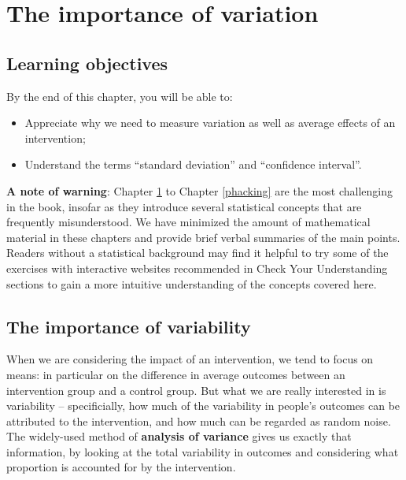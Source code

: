 \documentclass{krantz}
\providecommand{\tightlist}{%
\setlength{\itemsep}{0pt}\setlength{\parskip}{0pt}}
\begin{document}
\hypertarget{variation}{%
\chapter{The importance of variation}\label{variation}}

\hypertarget{learning-objectives-9}{%
\section{Learning objectives}\label{learning-objectives-9}}

By the end of this chapter, you will be able to:

\begin{itemize}
\tightlist
\item
  Appreciate why we need to measure variation as well as average effects of an intervention; 
\item
  Understand the terms ``standard deviation'' and ``confidence interval''.
\end{itemize}

\textbf{A note of warning}: Chapter \ref{variation} to Chapter \ref{phacking} are the most challenging in the book, insofar as they introduce several statistical concepts that are frequently misunderstood. We have minimized the amount of mathematical material in these chapters and provide brief verbal summaries of the main points. Readers without a statistical background may find it helpful to try some of the exercises with interactive websites recommended in Check Your Understanding sections to gain a more intuitive understanding of the concepts covered here.

\hypertarget{the-importance-of-variability}{%
\section{The importance of variability}\label{the-importance-of-variability}}

When we are considering the impact of an intervention, we tend to focus on means: in particular on the difference in average outcomes between an intervention group and a control group. But what we are really interested in is variability -- specificially, how much of the variability in people's outcomes can be attributed to the intervention, and how much can be regarded as random noise. The widely-used method of \textbf{analysis of variance} gives us exactly that information, by looking at the total variability in outcomes and considering what proportion is accounted for by the intervention.
\end{document}
